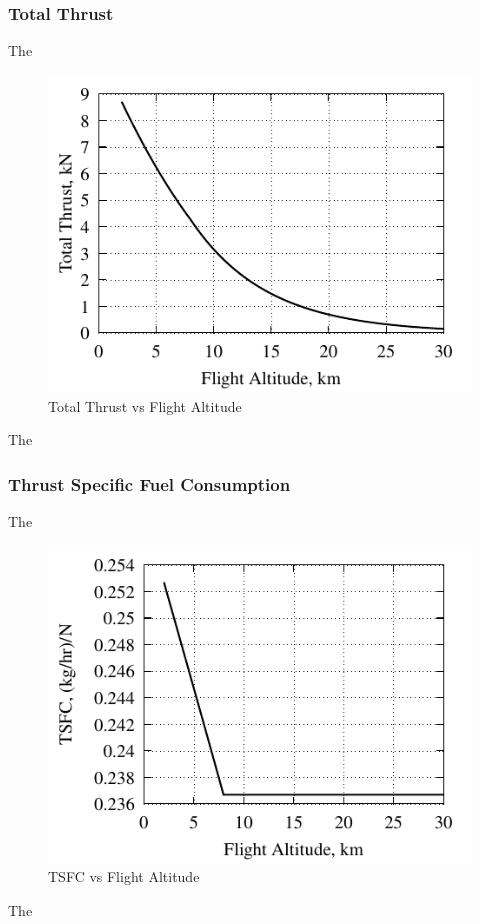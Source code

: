 \documentclass[conf]{new-aiaa} %
\begin{document}
\subsubsection{Total Thrust}
The

\begin{figure}[hbt!] %
    \centering
    \includegraphics[]{media/performance_parameter_files/part_d_T.pdf}
    \caption{\label{fig:partdt}Total Thrust vs Flight Altitude}
\end{figure}
The

\subsubsection{Thrust Specific Fuel Consumption}
The

\begin{figure}[hbt!] %
    \centering
    \includegraphics[]{media/performance_parameter_files/part_d_TSFC.pdf}
    \caption{\label{fig:partdtsfc}TSFC vs Flight Altitude}
\end{figure}
The
\end{document}
